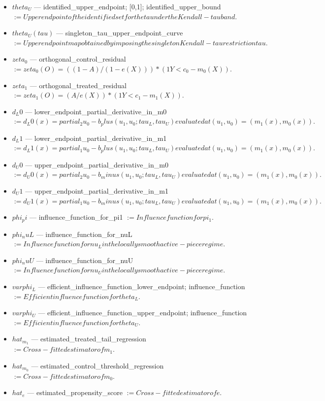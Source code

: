 \documentclass{article}
\begin{document}
\begin{itemize}
  \item $theta_U$ --- identified_upper_endpoint; [0,1]; identified_upper_bound $:= Upper endpoint of the identified set for theta under the Kendall-tau band.$
  \item $theta_U(tau)$ --- singleton_tau_upper_endpoint_curve $:= Upper endpoint map obtained by imposing the singleton Kendall-tau restriction {tau}.$
  \item $zeta_0$ --- orthogonal_control_residual $:= zeta_0(O) = ((1 - A) / (1 - e(X))) * (1{Y < c_0} - m_0(X)).$
  \item $zeta_1$ --- orthogonal_treated_residual $:= zeta_1(O) = (A / e(X)) * (1{Y < c_1} - m_1(X)).$
  \item $d_L0$ --- lower_endpoint_partial_derivative_in_m0 $:= d_L0(x) = partial_2{u_0 - b_plus(u_1, u_0; tau_L, tau_U)} evaluated at (u_1, u_0) = (m_1(x), m_0(x)).$
  \item $d_L1$ --- lower_endpoint_partial_derivative_in_m1 $:= d_L1(x) = partial_1{u_0 - b_plus(u_1, u_0; tau_L, tau_U)} evaluated at (u_1, u_0) = (m_1(x), m_0(x)).$
  \item $d_U0$ --- upper_endpoint_partial_derivative_in_m0 $:= d_U0(x) = partial_2{u_0 - b_minus(u_1, u_0; tau_L, tau_U)} evaluated at (u_1, u_0) = (m_1(x), m_0(x)).$
  \item $d_U1$ --- upper_endpoint_partial_derivative_in_m1 $:= d_U1(x) = partial_1{u_0 - b_minus(u_1, u_0; tau_L, tau_U)} evaluated at (u_1, u_0) = (m_1(x), m_0(x)).$
  \item $phi_pi$ --- influence_function_for_pi1 $:= Influence function for pi_1.$
  \item $phi_nuL$ --- influence_function_for_nuL $:= Influence function for nu_L in the locally smooth active-piece regime.$
  \item $phi_nuU$ --- influence_function_for_nuU $:= Influence function for nu_U in the locally smooth active-piece regime.$
  \item $varphi_L$ --- efficient_influence_function_lower_endpoint; influence_function $:= Efficient influence function for theta_L.$
  \item $varphi_U$ --- efficient_influence_function_upper_endpoint; influence_function $:= Efficient influence function for theta_U.$
  \item $hat_m_1$ --- estimated_treated_tail_regression $:= Cross-fitted estimator of m_1.$
  \item $hat_m_0$ --- estimated_control_threshold_regression $:= Cross-fitted estimator of m_0.$
  \item $hat_e$ --- estimated_propensity_score $:= Cross-fitted estimator of e.$

\end{itemize}
\end{document}
